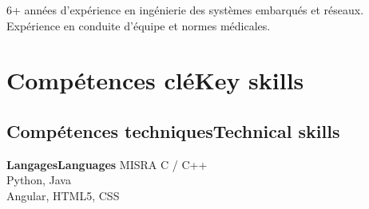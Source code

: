 \vspace{-1.3cm}

\ifnativelang
\newcommand{\CVheader}{6+ ann\'ees d'exp\'erience en ing\'enierie des syst\`emes embarqu\'es et r\'eseaux.\\%
Expérience en conduite d’équipe et normes médicales.}
\else
\newcommand{\CVheader}{6+ years of experience in Real-Time systems, embedded linux and networking.\\
Experience in project steering and team management.}
\fi

\begin{center}
\textcolor{color1}{\Large{\CVheader}}
\end{center}

\section{\ifnativelang Comp\'etences cl\'e\else Key skills\fi}
\subsection{\ifnativelang Comp\'etences techniques\else Technical skills\fi}

{\ifnativelang\textbf{Langages}\else \textbf{Languages}\fi}{
 MISRA C / C++\\
 Python, Java \\
 Angular, HTML5, CSS
}

\vspace{\ItemsSpacing}


